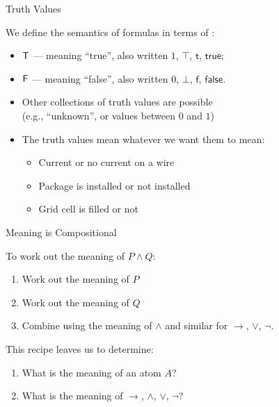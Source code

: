 \documentclass[xetex,aspectratio=169,14pt,hyperref={pdfpagelabels=true,pdflang={en-GB}}]{beamer}
\begin{document}

\begin{frame}
  {Truth Values}

  We define the semantics of formulas in terms of :

  \begin{itemize}
  \item $\mathsf{T}$ --- meaning ``true'', also written $1$, $\top$, $\mathsf{t}$, $\mathsf{true}$;
  \item $\mathsf{F}$ --- meaning ``false'', also written $0$, $\bot$, $\mathsf{f}$, $\mathsf{false}$.
  \end{itemize}

  \bigskip
  \pause

  \begin{itemize}
  \item Other collections of truth values are possible \\
    \qquad\textcolor{black!60}{(e.g., ``unknown'', or values between $0$ and $1$)}
  \item The truth values mean whatever we want them to mean:
    \begin{itemize}
    \item Current or no current on a wire
    \item Package is installed or not installed
    \item Grid cell is filled or not
    \end{itemize}
  \end{itemize}
\end{frame}

\begin{frame}
  {Meaning is Compositional}

  \vspace{0.75em}

  \quad {}

  \pause
  \bigskip

  To work out the meaning of $P \land Q$:
  \begin{enumerate}
  \item Work out the meaning of $P$
  \item Work out the meaning of $Q$
  \item Combine using the meaning of $\land$ \textcolor{black!60}{and similar for $\to$, $\lor$, $\lnot$.}
  \end{enumerate}


  \pause
  \bigskip

  This recipe leaves us to determine:
  \begin{enumerate}
  \item What is the meaning of an atom $A$?
  \item What is the meaning of $\to$, $\land$, $\lor$, $\lnot$?
  \end{enumerate}
\end{frame}
\end{document}
